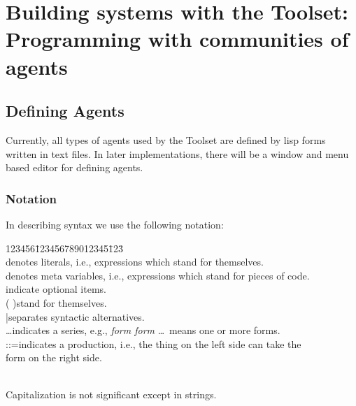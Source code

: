 \part{Building systems with the Toolset:  Programming with communities
of agents}

\chapter{Defining Agents}


Currently, all types of agents used by the Toolset are defined by lisp
forms written in text files. In later  implementations, there will be
a window and menu based editor for defining agents.



\section{Notation\label{notation}}

In describing syntax we use the following notation:

\begin{tabbing}
123456\=123456789012345\=123\= \kill
\\
\>denotes literals, i.e., expressions which stand for
themselves. \\
\>denotes meta variables, i.e., expressions which stand
for pieces of code. \\
\>[  ]\>indicate optional items. \\
\>(  )\>stand for themselves. \\
\>|\>separates syntactic alternatives. \\
\>\ldots\>indicates a series, e.g., {\it form form\/} \ldots\ means one
or more forms. \\
\>::=\>indicates a production, i.e., the thing on the left side can
take the \\
\>\>\>form on the right side. \\
\\
\end{tabbing}
Capitalization is not significant except in strings.

